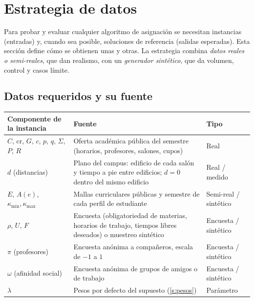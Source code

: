 \documentclass[11pt,letterpaper]{article}
\theoremstyle{definition}
\theoremstyle{remark}
\theoremstyle{plain}
\begin{document}
\section{Estrategia de datos}\label{sec:datos}
Para probar y evaluar cualquier algoritmo de asignación se necesitan
instancias (entradas) y, cuando sea posible, soluciones de referencia
(salidas esperadas). Esta sección define cómo se obtienen unas y otras.
La estrategia combina \emph{datos reales o semi-reales}, que dan realismo,
con un \emph{generador sintético}, que da volumen, control y casos límite.

\subsection{Datos requeridos y su fuente}
\begin{center}
\small
\begin{tabular}{p{4.6cm}p{6.2cm}p{3.6cm}}
\toprule
Componente de la instancia & Fuente & Tipo \\
\midrule
$C$, $\mathrm{cr}$, $G$, $c$, $p$, $q$, $\Sigma$, $P$, $R$ &
  Oferta académica pública del semestre (horarios, profesores, salones, cupos) &
  Real \\
$d$ (distancias) &
  Plano del campus: edificio de cada salón y tiempo a pie entre edificios;
  $d=0$ dentro del mismo edificio &
  Real / medido \\
$E$, $A(e)$, $\kappa_{\min},\kappa_{\max}$ &
  Mallas curriculares públicas y semestre de cada perfil de estudiante &
  Semi-real / sintético \\
$\rho$, $U$, $F$ &
  Encuesta (obligatoriedad de materias, horarios de trabajo, tiempos libres
  deseados) o muestreo sintético &
  Encuesta / sintético \\
$\pi$ (profesores) &
  Encuesta anónima a compañeros, escala de $-1$ a $1$ &
  Encuesta / sintético \\
$\omega$ (afinidad social) &
  Encuesta anónima de grupos de amigos o de trabajo &
  Encuesta / sintético \\
$\lambda$ &
  Pesos por defecto del supuesto (\ref{s:pesos}) &
  Parámetro \\
\bottomrule
\end{tabular}
\end{center}
\end{document}
